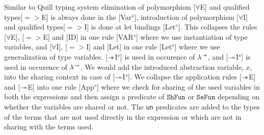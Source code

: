 Similar to Quill typing system \citep{morris_best_2016} elimination of polymorphism [$\forall$E] and qualified
types[$=>$E] is always done in the [Var$^s$], introduction of polymorphism [$\forall$I] and qualified types[$=>$I] is
done at let bindings [Let$^s$]. This collapses the rules [$\forall$E], [$=>$E] and [ID] in one rule [VAR$^s$] where
we use instantiation of type variables, and [$\forall$I], [$=>$I] and [Let] in one rule [Let$^s$] where we use generalization of type variables.
[$\mathrel{-\mkern-6mu*}$I$^s$] is used in occurence of $\lambda^{\mathrel{-\mkern-6mu*}} $, and [$\twoheadrightarrow$I$^s$] is used in occurence of $\lambda^{\twoheadrightarrow}$.
We would add the introduced abstraction variable, $x$, into the sharing context in case of [$\twoheadrightarrow$I$^s$].
We collapse the application rules [$\mathrel{-\mkern-6mu*}$E] and [$\twoheadrightarrow$E] into one rule [App$^s$] where we check for sharing of the used variables in both
the expressions and then assign a predicate of $\texttt{ShFun}$ or $\texttt{SeFun}$ depending on whether the variables
are shared or not. The \texttt{un} predicates are added to the types of the terms that are not used directly in the expression
or which are not in sharing with the terms used.

